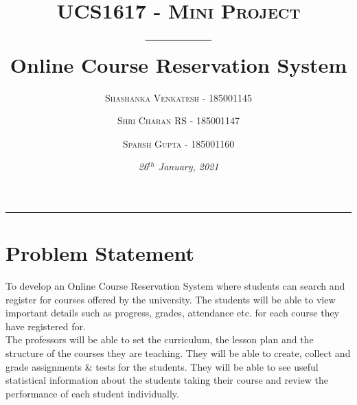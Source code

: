 \documentclass[12pt, a4]{article}
\title{{\large \textsc{UCS1617 - Mini Project}}\\---------\\\textbf{Online Course Reservation System}}
\author {
  \textsc{Shashanka Venkatesh - 185001145}
  \and
  \textsc{Shri Charan RS - 185001147}
  \and
  \textsc{Sparsh Gupta - 185001160}
}
\date{\normalsize{\textsl{26$^{th}$ January, 2021}}}
\begin{document}
\maketitle
\hrule

\section*{Problem Statement}
To develop an Online Course Reservation System where students can search and
register for courses offered by the university. The students will be able to view important details such as progress, grades, attendance etc. for each course they have registered for.\\
The professors will be able to set the curriculum, the lesson plan and the structure of the courses they are teaching. They will be able to create, collect and grade assignments \& tests for the students. They will be able to see useful statistical information about the students taking their course and review the performance of each student individually.
\end{document}
